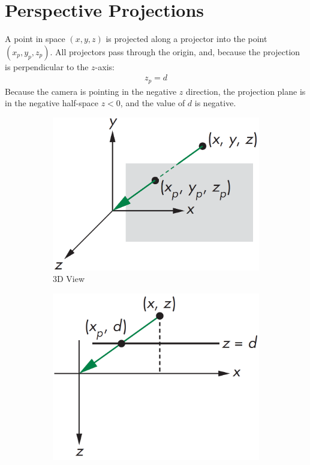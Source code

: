 \documentclass[../COS3712_Notes.tex]{subfiles}
\begin{document}
    \section{Perspective Projections}
      A point in space $(x, y, z)$ is projected along a projector into the point
      $(x_p, y_p, z_p)$.
      All projectors pass through the origin, and, because the projection is perpendicular
      to the $z$-axis:
      \begin{align*}
        z_p = d
      \end{align*}
      Because the camera is pointing in the negative $z$ direction,
      the projection plane is in the negative half-space $z < 0$,
      and the value of $d$ is negative.

      \begin{figure}[b]
        \begin{center}
          \begin{subfigure}{0.3\textwidth}
            \includegraphics[width=\textwidth]{images/chapter05/perspective_3d.png}
            \caption{3D View}
          \end{subfigure}
          \begin{subfigure}{0.3\textwidth}
            \includegraphics[width=\textwidth]{images/chapter05/perspective_top.png}

\end{subfigure}
\end{center}
\end{figure}
\end{document}
